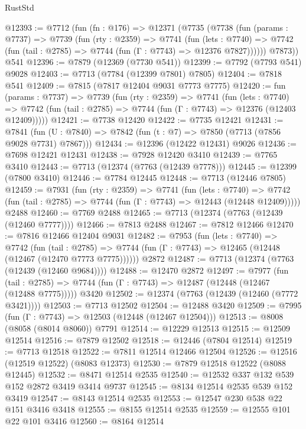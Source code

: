 \begin{lexlean}{RustStd}
\begin{coremodule}
@12393 := @7712
    (fun (fn : @176) =>
    @12371
      (@7735
        (@7738
          (fun (params : @7737) =>
          @7739
            (fun (rty : @2359) =>
            @7741
              (fun (lets : @7740) =>
              @7742 (fun (tail : @2785) => @7744 (fun (Γ : @7743) => @12376 @7827))))))
        @7873))
    @541
@12396 := @7879 (@12369 (@7730 @541))
@12399 := @7792 (@7793 @541) @9028
@12403 := @7713 (@7784 (@12399 @7801) @7805)
@12404 := @7818 @541
@12409 := @7815 (@7817 @12404 @9031 @7773 @7775)
@12420 := fun (params : @7737) =>
  @7739
    (fun (rty : @2359) =>
    @7741
      (fun (lets : @7740) =>
      @7742 (fun (tail : @2785) => @7744 (fun (Γ : @7743) => @12376 (@12403 @12409)))))
@12421 := @7738 @12420
@12422 := @7735 @12421
@12431 := @7841 (fun (U : @7840) => @7842 (fun (t : @7) => @7850 (@7713 (@7856 @9028 @7731) @7867)))
@12434 := @12396 (@12422 @12431) @9026
@12436 := @7698 @12421 @12431
@12438 := @7928 @12420 @3410
@12439 := @7765 @3410
@12443 := @7713 (@12374 (@7763 (@12439 @7778)))
@12445 := @12399 (@7800 @3410)
@12446 := @7784 @12445
@12448 := @7713 (@12446 @7805)
@12459 := @7931
    (fun (rty : @2359) =>
    @7741
      (fun (lets : @7740) =>
      @7742 (fun (tail : @2785) => @7744 (fun (Γ : @7743) => @12443 (@12448 @12409)))))
    @2488
@12460 := @7769 @2488
@12465 := @7713 (@12374 (@7763 (@12439 (@12460 @7777))))
@12466 := @7813 @2488
@12467 := @7812 @12466
@12470 := @7816 @12466 @12404 @9031
@12482 := @7953
    (fun (lets : @7740) =>
    @7742
      (fun (tail : @2785) =>
      @7744 (fun (Γ : @7743) => @12465 (@12448 (@12467 (@12470 @7773 @7775))))))
    @2872
@12487 := @7713 (@12374 (@7763 (@12439 (@12460 @9684))))
@12488 := @12470 @2872
@12497 := @7977
    (fun (tail : @2785) => @7744 (fun (Γ : @7743) => @12487 (@12448 (@12467 (@12488 @7775)))))
    @3420
@12502 := @12374 (@7763 (@12439 (@12460 (@7772 @3421))))
@12503 := @7713 @12502
@12504 := @12488 @3420
@12509 := @7995 (fun (Γ : @7743) => @12503 (@12448 (@12467 @12504)))
@12513 := @8008 (@8058 (@8014 @8060)) @7791
@12514 := @12229 @12513
@12515 := @12509 @12514
@12516 := @7879 @12502
@12518 := @12446 (@7804 @12514)
@12519 := @7713 @12518
@12522 := @7811 @12514 @12466 @12504
@12526 := @12516 (@12519 @12522) (@8083 @12373)
@12530 := @7879 @12518 @12522 (@8088 @12445)
@12532 := @8471 @12514 @2535
@12540 := @12532 @337 @132 @539 @152 @2872 @3419 @3414 @9737
@12545 := @8134 @12514 @2535 @539 @152 @3419
@12547 := @8143 @12514 @2535
@12553 := @12547 @230 @538 @22 @151 @3416 @3418
@12555 := @8155 @12514 @2535
@12559 := @12555 @101 @22 @101 @3416
@12560 := @8164 @12514

\end{coremodule}
\end{lexlean}

